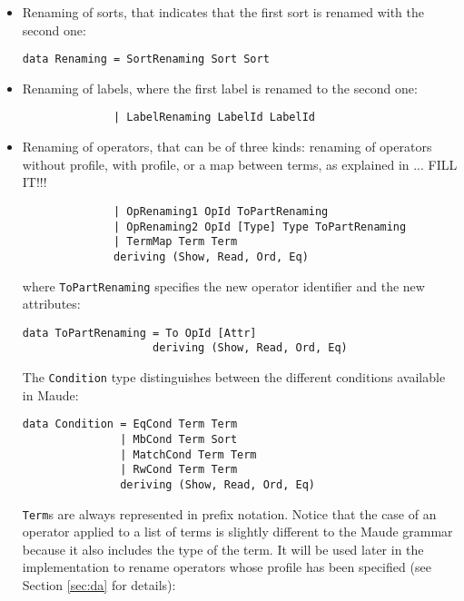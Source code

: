 \begin{itemize}

\item Renaming of sorts, that indicates that the first sort is renamed
with the second one:

{\codesize
\begin{verbatim}
data Renaming = SortRenaming Sort Sort
\end{verbatim}
}

\item Renaming of labels, where the first label is renamed to the
second one:

{\codesize
\begin{verbatim}
              | LabelRenaming LabelId LabelId
\end{verbatim}
}

\item Renaming of operators, that can be of three kinds: renaming
of operators without profile, with profile, or a map between terms,
as explained in ... FILL IT!!!

{\codesize
\begin{verbatim}
              | OpRenaming1 OpId ToPartRenaming
              | OpRenaming2 OpId [Type] Type ToPartRenaming
              | TermMap Term Term
              deriving (Show, Read, Ord, Eq)
\end{verbatim}
}

\noindent where \verb"ToPartRenaming" specifies the new operator identifier
and the new attributes:

{\codesize
\begin{verbatim}
data ToPartRenaming = To OpId [Attr]
                    deriving (Show, Read, Ord, Eq)
\end{verbatim}
}

The \verb"Condition" type distinguishes between the different conditions
available in Maude:

{\codesize
\begin{verbatim}
data Condition = EqCond Term Term
               | MbCond Term Sort
               | MatchCond Term Term
               | RwCond Term Term
               deriving (Show, Read, Ord, Eq)
\end{verbatim}
}

\verb"Term"s are always represented in prefix notation. Notice that
the case of an operator applied to a list of terms is slightly different
to the Maude grammar because it also includes the type of the term.
It will be used later in the implementation to rename operators whose
profile has been specified (see Section \ref{sec:da} for details):


\end{itemize}

